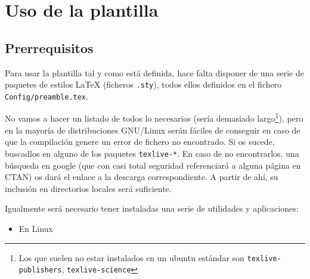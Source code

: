 {  \section{Uso de la plantilla}
  \label{sec:uso-generico-de}


  \subsection{Prerrequisitos}
  \label{sec:prerrequisitos}

  Para usar la plantilla tal y como está definida, hace falta disponer de una serie de paquetes de estilos \LaTeX{} (ficheros \texttt{.sty}), todos ellos definidos en el fichero \texttt{Config/preamble.tex}.

  No vamos a hacer un listado de todos lo necesarios (sería demasiado largo\footnote{Los que suelen no estar instalados en un ubuntu estándar son \texttt{texlive-publishers}, \texttt{texlive-science}}), pero en la mayoría de distribuciones GNU/Linux serán fáciles de conseguir en caso de que la compilación genere un error de fichero no encontrado. Si os sucede, buscadlos en alguno de los paquetes \texttt{texlive-*}. En caso de no encontrarlos, una búsqueda en google (que con casi total seguridad referenciará a alguna página en CTAN) os dará el enlace a la descarga correspondiente. A partir de ahí, su inclusión en directorios locales será suficiente.

  Igualmente será necesario tener instaladas una serie de utilidades y aplicaciones:

  \begin{itemize}
    \item En Linux


\end{itemize}}
